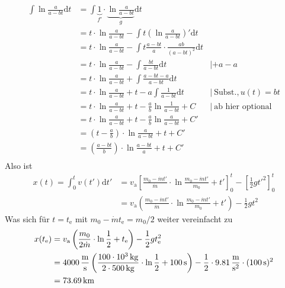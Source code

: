 \documentclass[a4paper]{scrartcl}
\begin{document}
\begin{enumerate}[noitemsep]
  \begin{align*}
    \int \ln \frac{a}{a-bt}\text{d}t &= \int \underbrace{1}_{f'} \cdot \underbrace{\ln \frac{a}{a-bt}}_{g}\text{d}t \\
    &= t \cdot \ln \frac{a}{a-bt} - \int t \left( \ln \frac{a}{a-bt} \right)' \text{d}t \\
    &= t \cdot \ln \frac{a}{a-bt} - \int t \frac{a-bt}{a} \cdot \frac{ab}{(a-bt)^2} \text{d}t\\
    &= t \cdot \ln \frac{a}{a-bt} - \int \frac{bt}{a-bt}\text{d}t & | +a -a \\
    &= t \cdot \ln \frac{a}{a-bt} + \int \frac{a-bt-a}{a-bt}\text{d}t\\
    &= t \cdot \ln \frac{a}{a-bt} + t -a \int \frac{1}{a-bt}\text{d}t &|~ \text{Subst.}, u(t) = bt\\
    &= t \cdot \ln \frac{a}{a-bt} + t - \frac{a}{b} \ln \frac{1}{a-bt} + C &|~\text{ab hier optional}\\
    &= t \cdot \ln \frac{a}{a-bt} + t - \frac{a}{b} \ln \frac{a}{a-bt} + C'\\
    &= \left(t-\frac{a}{b}\right) \cdot \ln \frac{a}{a-bt} + t + C'\\
    &= \left(\frac{a-bt}{b}\right) \cdot \ln \frac{a-bt}{a} + t + C'\\
  \end{align*}
Also ist 
\begin{align*}
 x(t) = \int_0^t v(t') \text{d}t' & = v_\text{a} \left[ \frac{m_0 - \dot mt'}{\dot m} \cdot \ln \frac{m_0 - \dot mt'}{m_0} + t' \right]_0^t - \left[ \frac{1}{2}gt'^2\right]_0^t \\
  & = v_\text{a} \left( \frac{m_0 - \dot mt'}{\dot m} \cdot \ln \frac{m_0 - \dot mt'}{m_0} + t' \right) - \frac{1}{2} gt^2
\end{align*}
Was sich für $t = t_\text{e}$ mit $m_0 - \dot m t_\text{e} = m_0/2$ weiter vereinfacht zu
\begin{align*}
  x(t_\text{e}) & = v_\text{a} \left( \frac{m_0}{2\dot m} \cdot \ln \frac{1}{2} + t_\text{e} \right) - \frac{1}{2}gt_\text{e}^2 \\
  &=\unit[4000]{\frac{m}{s}} \left( \frac{\unit[100 \cdot 10^3]{kg}}{2 \cdot \unit[500]{kg}} \cdot \ln \frac{1}{2} + \unit[100]{s} \right) - \frac{1}{2} \cdot \unit[9.81]{\frac{m}{s^2}} \cdot (\unit[100]{s})^2 \\
  &= \unit[73.69]{km}
\end{align*}


\end{enumerate}
\end{document}
